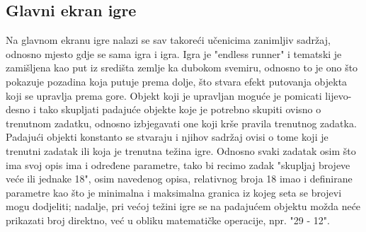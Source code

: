 \documentclass[times, utf8, zavrsni]{fer}
\begin{document}
		\subsection{Glavni ekran igre}
		Na glavnom ekranu igre nalazi se sav takoreći učenicima zanimljiv sadržaj, odnosno mjesto gdje se sama igra i igra. Igra je "endless runner" i tematski je zamišljena kao put iz središta zemlje ka dubokom svemiru, odnosno to je ono što pokazuje
		pozadina koja putuje prema dolje, što stvara efekt putovanja objekta koji se upravlja prema gore. Objekt koji je upravljan moguće je pomicati lijevo-desno i tako skupljati padajuće objekte koje je potrebno skupiti ovisno o trenutnom zadatku,
		odnosno izbjegavati one koji krše pravila trenutnog zadatka. Padajući objekti konstanto se stvaraju i njihov sadržaj ovisi o tome koji je trenutni zadatak ili koja je trenutna težina igre. Odnosno svaki zadatak osim što ima svoj opis ima i određene
		parametre, tako bi recimo zadak "skupljaj brojeve veće ili jednake 18", osim navedenog opisa, relativnog broja 18 imao i definirane parametre kao što je minimalna i maksimalna granica iz kojeg seta se brojevi mogu dodjeliti; nadalje, pri većoj 
		težini igre se na padajućem objektu možda neće prikazati broj direktno, već u obliku matematičke operacije, npr. "29 - 12".
\end{document}
